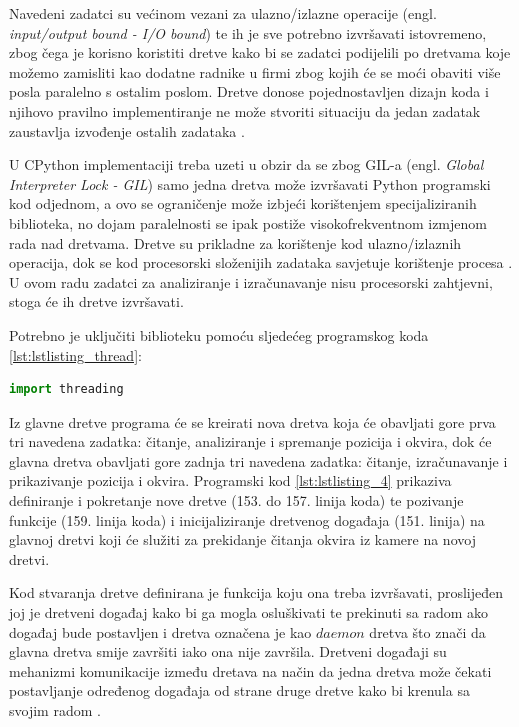 \documentclass{foi}
\begin{document}
Navedeni zadatci su većinom vezani za ulazno/izlazne operacije (engl. \emph{input/output bound - I/O bound}) te ih je sve potrebno izvršavati istovremeno, zbog čega je korisno koristiti dretve kako bi se zadatci podijelili po dretvama koje možemo zamisliti kao dodatne radnike u firmi zbog kojih će se moći obaviti više posla paralelno s ostalim poslom. Dretve donose pojednostavljen dizajn koda i njihovo pravilno implementiranje ne može stvoriti situaciju da jedan zadatak zaustavlja izvođenje ostalih zadataka \cite{AndersonJim}.

U CPython implementaciji treba uzeti u obzir da se zbog GIL-a (engl. \emph{Global Interpreter Lock - GIL}) samo jedna dretva može izvršavati Python programski kod odjednom, a ovo se ograničenje može izbjeći korištenjem specijaliziranih biblioteka, no dojam paralelnosti se ipak postiže visokofrekventnom izmjenom rada nad dretvama. Dretve su prikladne za korištenje kod ulazno/izlaznih operacija, dok se kod procesorski složenijih zadataka savjetuje korištenje procesa \cite{PythonSoftwareFoundation2}. U ovom radu zadatci za analiziranje i izračunavanje nisu procesorski zahtjevni, stoga će ih dretve izvršavati.

\flushleft Potrebno je uključiti biblioteku pomoću sljedećeg programskog koda \ref{lst:lstlisting_thread}:
\begin{lstlisting}[language=Python, label={lst:lstlisting_thread}, firstnumber=2, style=colored, caption=Uključivanje biblioteke $threading$]
import threading
\end{lstlisting}

\justifying

Iz glavne dretve programa će se kreirati nova dretva koja će obavljati gore prva tri navedena zadatka: čitanje, analiziranje i spremanje pozicija i okvira, dok će glavna dretva obavljati gore zadnja tri navedena zadatka: čitanje, izračunavanje i prikazivanje pozicija i okvira. Programski kod \ref{lst:lstlisting_4} prikaziva definiranje i pokretanje nove dretve (153. do 157. linija koda) te pozivanje funkcije (159. linija koda) i inicijaliziranje dretvenog događaja (151. linija) na glavnoj dretvi koji će služiti za prekidanje čitanja okvira iz kamere na novoj dretvi.

Kod stvaranja dretve definirana je funkcija koju ona treba izvršavati, proslijeđen joj je dretveni događaj kako bi ga mogla osluškivati te prekinuti sa radom ako događaj bude postavljen i dretva označena je kao $daemon$ dretva što znači da glavna dretva smije završiti iako ona nije završila. Dretveni događaji su mehanizmi komunikacije između dretava na način da jedna dretva može čekati postavljanje određenog događaja od strane druge dretve kako bi krenula sa svojim radom \cite{PythonSoftwareFoundation2}.
\end{document}
